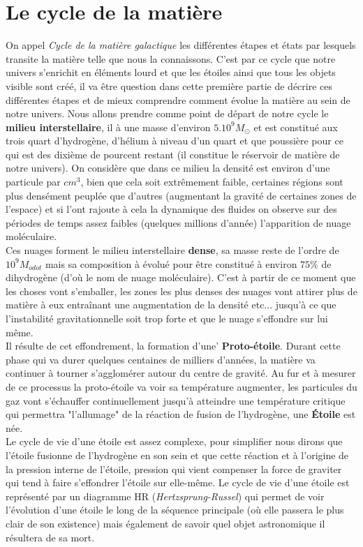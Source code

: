 \documentclass[11pt]{book} %
\begin{document}
\section{Le cycle de la matière}
On appel \textit{Cycle de la matière galactique} les différentes étapes et états par lesquels transite la matière telle que nous la connaissons. C'est par ce cycle que notre univers s’enrichit en éléments lourd et que les étoiles ainsi que tous les objets visible sont créé, il va être question dans cette première partie de décrire ces différentes étapes et de mieux comprendre comment évolue la matière au sein de notre univers.
\n
Nous allons prendre comme point de départ de notre cycle le \textbf{milieu interstellaire}, il à une masse d'environ $5.10^{9}M_{\odot}$ et est constitué aux trois quart d'hydrogène, d'hélium à niveau d'un quart et que poussière pour ce qui est des dixième de pourcent restant (il constitue le réservoir de matière de notre univers). On considère que dans ce milieu la densité est environ d'une particule par $cm^3$, bien que cela soit extrêmement faible, certaines régions sont plus densément peuplée que d'autres (augmentant la gravité de certaines zones de l'espace) et si l'ont rajoute à cela la dynamique des fluides on observe sur des périodes de temps assez faibles (quelques millions d'année) l'apparition de nuage moléculaire.\\ Ces nuages forment le milieu interstellaire \textbf{dense}, sa masse reste de l'ordre de $10^{9}M_{odot}$ mais sa composition à évolué pour être constitué à environ $75\%$ de dihydrogène (d’où le nom de nuage moléculaire). C'est à partir de ce moment que les choses vont s'emballer, les zones les plus denses des nuages vont attirer plus de matière à eux entraînant une augmentation de la densité etc... jusqu’à ce que l'instabilité gravitationnelle soit trop forte et que le nuage s’effondre sur lui même.\\
Il résulte de cet effondrement, la formation d'une' \textbf{Proto-étoile}. Durant cette phase qui va durer quelques centaines de milliers d'années, la matière va continuer à tourner s'agglomérer autour du centre de gravité. Au fur et à mesurer de ce processus la proto-étoile va voir sa température augmenter, les particules du gaz vont s'échauffer continuellement jusqu’à atteindre une température critique qui permettra "l'allumage" de la réaction de fusion de l'hydrogène, une \textbf{Étoile} est née.\\
Le cycle de vie d'une étoile est assez complexe, pour simplifier nous dirons que l'étoile fusionne de l’hydrogène en son sein et que cette réaction et à l'origine de la pression interne de l'étoile, pression qui vient compenser la force de graviter qui tend à faire s’effondrer l'étoile sur elle-même. Le cycle de vie d'une étoile est représenté par un diagramme HR (\textit{Hertzsprung-Russel}) qui permet de voir l'évolution d'une étoile le long de la séquence principale (où elle passera le plus clair de son existence) mais également de savoir quel objet astronomique il résultera de sa mort.
\end{document}
